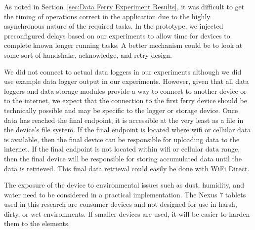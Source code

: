 \documentclass[10pt,twocolumn]{article}
\begin{document}


As noted in Section~\ref{sec:Data Ferry Experiment Results}, it was difficult to get the timing of operations correct in the application due to the highly asynchronous nature of the required tasks.
In the prototype, we injected preconfigured delays based on our experiments to allow time for devices to complete known longer running tasks.
A better mechanism could be to look at some sort of handshake, acknowledge, and retry design.

We did not connect to actual data loggers in our experiments although we did use example data logger output in our experiments.
However, given that all data loggers and data storage modules provide a way to connect to another device or to the internet, 
we expect that the connection to the first ferry device should be technically possible and may be specific to the logger or storage device.
Once data has reached the final endpoint, it is accessible at the very least as a file in the device's file system.
If the final endpoint is located where wifi or cellular data is available, 
then the final device can be responsible for uploading data to the internet.
If the final endpoint is not located within wifi or cellular data range, 
then the final device will be responsible for storing accumulated data until the data is retrieved.
This final data retrieval could easily be done with WiFi Direct.

The exposure of the device to environmental issues such as dust, humidity, and water need to be considered in a practical implementation.
The Nexus 7 tablets used in this research are consumer devices and not designed for use in harsh, dirty, or wet environments.
If smaller devices are used, it will be easier to harden them to the elements.
\end{document}
